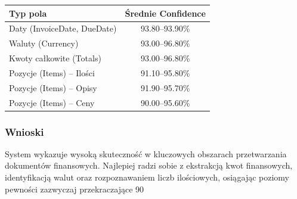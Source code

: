 \begin{center}
	\begin{tabular}{|l|c|}
		\hline
		\textbf{Typ pola} & \textbf{Średnie Confidence} \\
		\hline
		Daty (InvoiceDate, DueDate) & 93.80–93.90\% \\
		Waluty (Currency) & 93.00–96.80\% \\
		Kwoty całkowite (Totals) & 93.00–96.80\% \\
		Pozycje (Items) – Ilości & 91.10–95.80\% \\
		Pozycje (Items) – Opisy & 91.90–95.70\% \\
		Pozycje (Items) – Ceny & 90.00–95.60\% \\
		\hline
	\end{tabular}
\end{center}



\subsubsection{Wnioski}

System wykazuje wysoką skuteczność w kluczowych obszarach przetwarzania dokumentów finansowych. Najlepiej radzi sobie z ekstrakcją kwot finansowych, identyfikacją walut oraz rozpoznawaniem liczb ilościowych, osiągając poziomy pewności zazwyczaj przekraczające 90%
